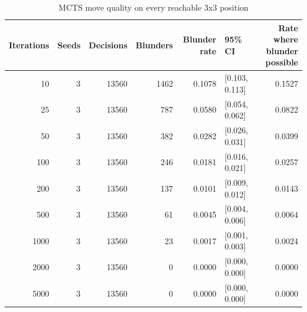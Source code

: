 \begin{table}[!t]
\centering
\caption{MCTS move quality on every reachable 3x3 position}
\label{tab:verify_quality}
\small
\begin{tabular}{rrrrrlr}
\toprule
Iterations & Seeds & Decisions & Blunders & Blunder rate & 95\% CI & Rate where blunder possible \\
\midrule
10 & 3 & 13560 & 1462 & 0.1078 & [0.103, 0.113] & 0.1527 \\
25 & 3 & 13560 & 787 & 0.0580 & [0.054, 0.062] & 0.0822 \\
50 & 3 & 13560 & 382 & 0.0282 & [0.026, 0.031] & 0.0399 \\
100 & 3 & 13560 & 246 & 0.0181 & [0.016, 0.021] & 0.0257 \\
200 & 3 & 13560 & 137 & 0.0101 & [0.009, 0.012] & 0.0143 \\
500 & 3 & 13560 & 61 & 0.0045 & [0.004, 0.006] & 0.0064 \\
1000 & 3 & 13560 & 23 & 0.0017 & [0.001, 0.003] & 0.0024 \\
2000 & 3 & 13560 & 0 & 0.0000 & [0.000, 0.000] & 0.0000 \\
5000 & 3 & 13560 & 0 & 0.0000 & [0.000, 0.000] & 0.0000 \\
\bottomrule
\end{tabular}
\end{table}
